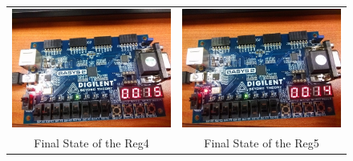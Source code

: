 \documentclass[a4paper]{article}
\begin{document}
\begin{figure}[ht!]
\begin{tabular}{c|c}
        \includegraphics[scale=0.3]{reg4}&\includegraphics[scale=0.3]{reg5}\\
        Final State of the Reg4\label{fig:reg4}&Final State of the Reg5\label{fig:reg5}
        \\

\end{tabular}
\end{figure}
\end{document}
